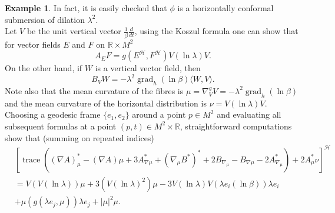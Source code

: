 \documentclass[12pt]{amsart}
\theoremstyle{plain}
\theoremstyle{definition}
\newtheorem{ex}{Example}
\begin{document}
\begin{ex}
In fact, it is easily checked that $\phi$ is a horizontally conformal
submersion of dilation $\lambda^2$.\\
Let  $V$ be the unit vertical vector $\frac{1}{\beta} \frac{d}{dt}$, using the Koszul
formula one can show that for vector fields $E$ and $F$  on ${{\mathbb R}} \times M^2$
$$A_{E}F = g(E^{\mathcal{H}},F^{\mathcal{H}}) V(\ln \lambda) V.$$
On the other hand, if $W$ is a vertical vector field, then
$$ B_{V} W = - \lambda^{2} \operatorname{grad}_{h} (\ln\beta) \langle W,V\rangle .$$
Note also that the mean curvature of the fibres is $\mu = \nabla^{g}_{V} V = -
\lambda^{2} \operatorname{grad}_{h} (\ln\beta)$ and the mean curvature of the horizontal distribution
is $\nu = V(\ln\lambda )
V$.\\

 Choosing a geodesic frame $\{ e_1 ,e_2 \}$ around a point
$p\in M^2$ and evaluating all subsequent formulas at a point $(p,t)\in M^2 \times
{{\mathbb R}}$, straightforward computations show that (summing on repeated indices)
\begin{align*}
&[ \operatorname{trace}  ( (\nabla A)^{*}_{\mu} - (\nabla A)\mu + 3 A^{*}_{\nabla \mu} +
(\nabla_{\mu}B^{*})^{*} + 2 B_{\nabla_{\mu}} - B_{\nabla\mu} -2 A^{*}_{\nabla_{\mu}}) + 2 A^{*}_{\mu}\nu ]^{\mathcal{H}} \\
&= V(V(\ln\lambda))\mu + 3(V(\ln\lambda)^2)  \mu -3V(\ln\lambda) V(\lambda
e_{i}(\ln\beta)) \lambda e_{i}  \\
&+ \mu(g(\lambda e_{j},\mu)) \lambda e_{j} + |\mu|^{2} \mu .
\end{align*}


\end{ex}
\end{document}
